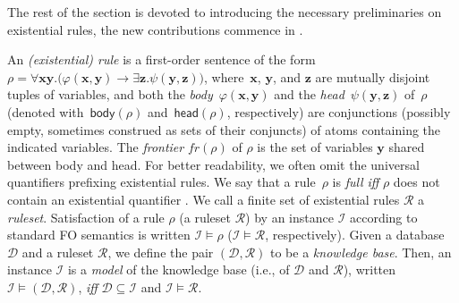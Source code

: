 \documentclass[10pt,a4paper]{amsart}
\theoremstyle{definition}
\numberwithin{equation}{section}
\theoremstyle{plain}
\theoremstyle{definition}
\theoremstyle{myexample}
\theoremstyle{plain}
\theoremstyle{definition}
\renewcommand{\vec}[1]{\boldsymbol{#1}}
\newcommand{\instance}{\mathcal{I}}
\newcommand{\database}{\mathcal{D}}
\newcommand{\db}{\database}
\newcommand{\head}{\fcn{head}}
\newcommand{\body}{\fcn{body}}
\newcommand{\fcn}[1]{\mathsf{#1}}
\newcommand{\ruleset}{\calr}
\newcommand{\calr}{\mathcal{R}}
\newcommand{\fr}{\mathit{fr}}
\newcommand{\vx}{\vec{x}}
\newcommand{\vy}{\vec{y}}
\newcommand{\vz}{\vec{z}}
\newcommand{\iffi}{\textit{iff} } %
\renewcommand{\phi}{\varphi}
\begin{document}
\pagebreak

The rest of the section is devoted to introducing the necessary preliminaries on existential rules, the new contributions commence in .


\medskip {}
An \emph{(existential) rule} is a first-order sentence of the  
form~$\rho = \forall{\vx\vy}. \big( \phi(\vx, \vy)
\rightarrow \exists{\vz}.\psi(\vy, \vz) \big)$,
where~$\vx$, $\vy$, and $\vz$ are mutually disjoint tuples of variables, and both 
the \emph{body}~$\phi(\vx, \vy)$ and the \emph{head}~$\psi(\vy, \vz)$ of~$\rho$  (denoted with~$\body(\rho)$ and~$\head(\rho)$, respectively) are conjunctions (possibly empty, sometimes construed as sets of their conjuncts) of atoms containing %
the indicated variables.
The \emph{frontier} $\fr(\rho)$ of $\rho$ is the set of variables $\vy$ shared between body and head. For better readability, we often omit the universal quantifiers prefixing existential rules. 
%
We say that a rule~$\rho$ is 
\emph{full} \iffi $\rho$ does not contain an existential quantifier%
. We call a finite set of existential rules $\ruleset$ a {\em ruleset}. Satisfaction of a rule $\rho$  (a ruleset $\ruleset$) by an instance $\instance$ according to standard FO semantics is written $\instance \models \rho$ ($\instance \models \ruleset$, respectively). Given a database $\database$ and a ruleset $\ruleset$, we define the pair $(\db,\ruleset)$ to be a \emph{knowledge base}. Then, an instance $\instance$ is a \emph{model} of the knowledge base (i.e., of $\database$ and $\ruleset$), written $\instance\models (\database,\ruleset)$, \iffi $\database \subseteq \instance$ and $\instance \models \ruleset$. 
\end{document}
